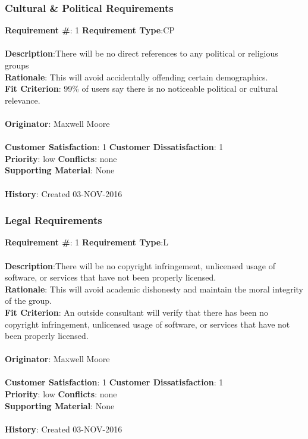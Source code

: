 \documentclass[titlepage]{article}
\begin{document}
\subsubsection{Cultural \& Political Requirements}
\begin{framed}
	\noindent\textbf{Requirement \#}: 1 \hfill \textbf{Requirement Type}:CP \hfill\\\\
	\noindent\textbf{Description}:There will be no direct references to any political or religious groups\\
	\textbf{Rationale}: This will avoid accidentally offending certain demographics.\\
	\textbf{Fit Criterion}: 99\% of users say there is no noticeable political or cultural relevance.\\\\
	\textbf{Originator}: Maxwell Moore\\\\
	\noindent\textbf{Customer Satisfaction}: 1 \hfill 	\textbf{Customer Dissatisfaction}: 1 \hfill\\
	\textbf{Priority}: low \hfill \textbf{Conflicts}: none \hfill\\
	\textbf{Supporting Material}: None\\\\
	\noindent\textbf{History}: Created 03-NOV-2016
\end{framed}

\subsubsection{Legal Requirements}
\begin{framed}
	\noindent\textbf{Requirement \#}: 1 \hfill \textbf{Requirement Type}:L\hfill\\\\
	\noindent\textbf{Description}:There will be no copyright infringement, unlicensed usage of software, or services that have not been properly licensed.\\
	\textbf{Rationale}: This will avoid academic dishonesty and maintain the moral integrity of the group.\\
	\textbf{Fit Criterion}: An outside consultant will verify that there has been no copyright infringement, unlicensed usage of software, or services that have not been properly licensed.\\\\
	\textbf{Originator}: Maxwell Moore\\\\
	\noindent\textbf{Customer Satisfaction}: 1 \hfill 	\textbf{Customer Dissatisfaction}: 1 \hfill\\
	\textbf{Priority}: low \hfill \textbf{Conflicts}: none \hfill\\
	\textbf{Supporting Material}: None\\\\
	\noindent\textbf{History}: Created 03-NOV-2016
\end{framed}
\end{document}
